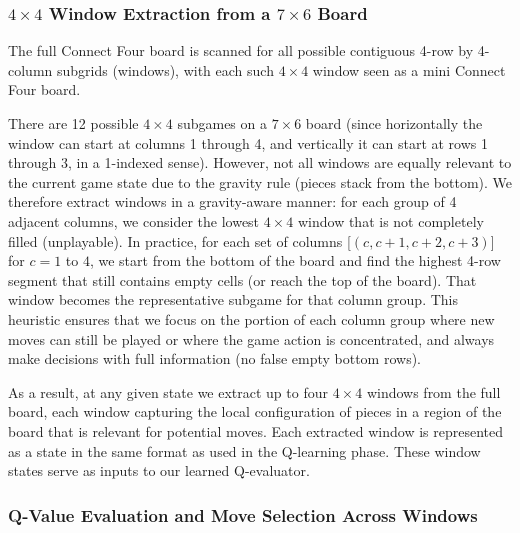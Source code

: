 \documentclass[10pt]{extarticle}
\begin{document}
\subsubsection{$4 \times 4$ Window Extraction from a $7 \times 6$ Board}

The full Connect Four board is scanned for all possible contiguous 4-row by 4-column subgrids (windows), with each such $4 \times 4$ window seen as a mini Connect Four board. 

There are 12 possible $4 \times 4$ subgames on a $7 \times 6$ board (since horizontally the window can start at columns 1 through 4, and vertically it can start at rows 1 through 3, in a 1-indexed sense). However, not all windows are equally relevant to the current game state due to the gravity rule (pieces stack from the bottom). We therefore extract windows in a gravity-aware manner: for each group of 4 adjacent columns, we consider the lowest $4 \times 4$ window that is not completely filled (unplayable). In practice, for each set of columns [$(c, c+1, c+2, c+3)$] for $c=1$ to $4$, we start from the bottom of the board and find the highest 4-row segment that still contains empty cells (or reach the top of the board). That window becomes the representative subgame for that column group. This heuristic ensures that we focus on the portion of each column group where new moves can still be played or where the game action is concentrated, and always make decisions with full information (no false empty bottom rows). 

As a result, at any given state we extract up to four $4 \times 4$ windows from the full board, each window capturing the local configuration of pieces in a region of the board that is relevant for potential moves. Each extracted window is represented as a state in the same format as used in the Q-learning phase. These window states serve as inputs to our learned Q-evaluator.

\subsubsection{Q-Value Evaluation and Move Selection Across Windows}
\end{document}

